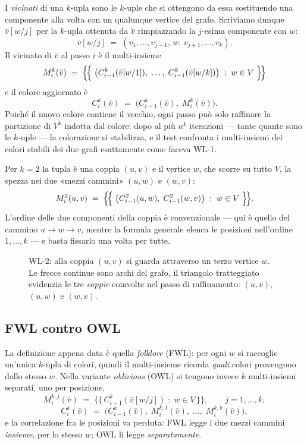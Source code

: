 I \emph{vicinati} di una $k$-upla sono le $k$-uple che si ottengono da essa sostituendo
una componente alla volta con un qualunque vertice del grafo. Scriviamo dunque
$\bar v[w/j]$ per la $k$-upla ottenuta da $\bar v$ rimpiazzando la $j$-esima componente
con $w$:
\[
  \bar v[w/j] \;=\; (v_1,\dots,v_{j-1},\,w,\,v_{j+1},\dots,v_k).
\]
Il vicinato di $\bar v$ al passo $i$ è il multi-insieme
\[
  M_i^k(\bar v) \;=\;
  \Bigl\{\!\Bigl\{\;
     \bigl( C_{i-1}^k(\bar v[w/1]),\; \dots,\; C_{i-1}^k(\bar v[w/k]) \bigr)
  \;:\; w \in V \;\Bigr\}\!\Bigr\}
\]
e il colore aggiornato è
\[
  C_i^k(\bar v) \;=\; \bigl( C_{i-1}^k(\bar v),\; M_i^k(\bar v) \bigr).
\]
Poiché il nuovo colore contiene il vecchio, ogni passo può solo raffinare la partizione
di $V^{k}$ indotta dal colore: dopo al più $n^{k}$ iterazioni --- tante quante sono le
$k$-uple --- la colorazione si stabilizza, e il test confronta i multi-insiemi dei
colori stabili dei due grafi esattamente come faceva WL-1.

\begin{esempio}[WL-2]
  Per $k = 2$ la tupla è una coppia $(u,v)$ e il vertice $w$, che scorre su tutto $V$,
  la spezza nei due «mezzi cammini» $(u,w)$ e $(w,v)$:
  \[
    M_i^2(u,v) \;=\;
    \Bigl\{\!\Bigl\{\; \bigl( C_{i-1}^2(u,w),\; C_{i-1}^2(w,v) \bigr) \;:\; w \in V
    \;\Bigr\}\!\Bigr\}.
  \]
  L'ordine delle due componenti della coppia è convenzionale --- qui è quello del
  cammino $u \to w \to v$, mentre la formula generale elenca le posizioni nell'ordine
  $1,\dots,k$ --- e basta fissarlo una volta per tutte.
\end{esempio}

\begin{figure}[H]
  \centering
  
  \caption{WL-2: alla coppia $(u,v)$ si guarda attraverso un terzo vertice $w$. Le
  frecce continue sono archi del grafo, il triangolo tratteggiato evidenzia le tre
  \emph{coppie} coinvolte nel passo di raffinamento: $(u,v)$, $(u,w)$ e $(w,v)$.}
  \label{fig:wl2-esempio}
\end{figure}

\subsection{FWL contro OWL}

La definizione appena data è quella \emph{folklore} (FWL): per ogni $w$ si raccoglie
un'unica $k$-upla di colori, quindi il multi-insieme ricorda \emph{quali} colori
provengono dallo stesso $w$. Nella variante \emph{oblivious} (OWL) si tengono invece
$k$ multi-insiemi separati, uno per posizione,
\[
  M_i^{k,j}(\bar v) \;=\;
  \bigl\{\!\bigl\{\, C_{i-1}^k(\bar v[w/j]) \;:\; w \in V \,\bigr\}\!\bigr\},
  \qquad j = 1,\dots,k,
\]
\[
  C_i^k(\bar v) \;=\;
  \bigl( C_{i-1}^k(\bar v),\; M_i^{k,1}(\bar v),\; \dots,\; M_i^{k,k}(\bar v) \bigr),
\]
e la correlazione fra le posizioni va perduta: FWL legge i due mezzi cammini
\emph{insieme}, per lo stesso $w$; OWL li legge \emph{separatamente}.

